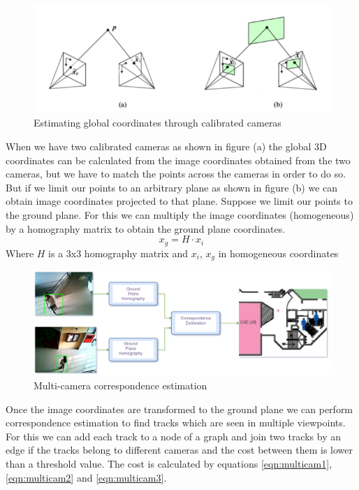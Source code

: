 \documentclass[12pt,a4paper]{report}
\begin{document}
\begin{figure}[H]
\includegraphics[width=\textwidth]{multi_cam.png}
\centering
\caption{Estimating global coordinates through calibrated cameras}
\label{multi_cam}
\end{figure}
When we have two calibrated cameras as shown in figure (a) the global 3D coordinates can be calculated from the image coordinates obtained from the two cameras, but we have to match the points across the cameras in order to do so. But if we limit our points to an arbitrary plane as shown in figure (b) we can obtain image coordinates projected to that plane. Suppose we limit our points to the ground plane. For this we can multiply the image coordinates (homogeneous) by a homography matrix to obtain the ground plane coordinates.
\begin{equation}
x_g = H \cdot x_i
\end{equation}
Where $H$ is a 3x3 homography matrix and $x_i$, $x_g$ in homogeneous coordinates
\begin{figure}[H]
\includegraphics[width=\textwidth]{multi_cam_map.png}
\centering
\caption{Multi-camera correspondence estimation}
\label{multi_cam_map}
\end{figure}
Once the image coordinates are transformed to the ground plane we can perform correspondence estimation to find tracks which are seen in multiple viewpoints. For this we can add each track to a node of a graph and join two tracks by an edge if the tracks belong to different cameras and the cost between them is lower than a threshold value.  The cost is calculated by equations \ref{eqn:multicam1}, \ref{eqn:multicam2} and \ref{eqn:multicam3}.
\end{document}
